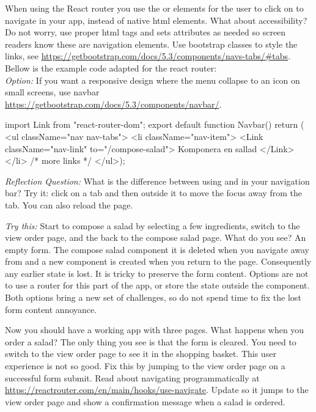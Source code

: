 \documentclass[fleqn, article, a4paper]{memoir}
\begin{document}
\begin{Assignments}
\noindent When using the React router you use the  or  elements for the user to click on to navigate in your app, instead of native  html elements. What about accessibility? Do not worry,  use proper html tags and sets  attributes as needed so screen readers know these are navigation elements. Use bootstrap classes to style the links, see \url{https://getbootstrap.com/docs/5.3/components/navs-tabs/#tabs}. Bellow is the example code adapted for the react router:
\\ \emph{Option:} If you want a responsive design where the menu collapse to an icon on small screens, use navbar \url{https://getbootstrap.com/docs/5.3/components/navbar/}.

\begin{Code}
import { Link } from "react-router-dom";
export default function Navbar() {
  return (
  <ul className="nav nav-tabs">
    <li className="nav-item">
      <Link className="nav-link" to="/compose-salad">
        Komponera en sallad
      </Link>
    </li>
    {/* more links */}
  </ul>);
}
\end{Code}

\noindent \emph{Reflection Question:} What is the difference between using  and  in your navigation bar? Try it: click on a tab and then outside it to move the focus away from the tab. You can also reload the page.

\emph{Try this:} Start to compose a salad by selecting a few ingredients, switch to the view order page, and the back to the compose salad page. What do you see? An empty form. The compose salad component it is deleted when you navigate away from and a new component is created when you return to the page. Consequently any earlier state is lost. It is tricky to preserve the form content. Options are not to use a router for this part of the app, or store the state outside the component. Both options bring a new set of challenges, so do not spend time to fix the lost form content annoyance.

\item Now you should have a working app with three pages. What happens when you order a salad? The only thing you see is that the form is cleared. You need to switch to the view order page to see it in the shopping basket. This user experience is not so good. Fix this by jumping to the view order page on a successful form submit. Read about navigating programmatically at \url{https://reactrouter.com/en/main/hooks/use-navigate}. Update  so it jumps to the view order page and show a confirmation message when a salad is ordered.


\end{Assignments}
\end{document}
